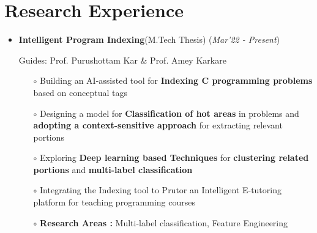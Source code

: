 \documentclass[10.8pt, a4paper]{extarticle}
\newcommand{\shorterSection}[1]{\vspace{-10pt}\section{#1}}
\begin{document}
\shorterSection{Research Experience}
\vspace{-2pt}
\begin{itemize}
\item \textbf{Intelligent Program Indexing}(M.Tech Thesis)
\hfill\hfill(\textit{Mar'22 - Present})

Guides: Prof. Purushottam Kar \& Prof. Amey Karkare
\begin{itemize}
          \item[$\circ$] Building an AI-assisted tool for \textbf{Indexing C programming problems} based on conceptual tags\\[-0.6cm]
          
          \item[$\circ$] Designing a model for \textbf{Classification of hot areas} in problems and \textbf{adopting a context-sensitive approach} for extracting relevant portions\\[-0.6cm]
          \item[$\circ$] Exploring \textbf {Deep learning based Techniques} for \textbf {clustering related portions} and \textbf{multi-label classification}\\[-0.6cm]
          \item[$\circ$] Integrating the Indexing tool to Prutor an Intelligent E-tutoring platform for teaching programming courses\\[-0.6cm]
          \item[$\circ$] \textbf{Research Areas :} Multi-label classification, Feature Engineering
          
    \end{itemize}
\end{itemize}
\medskip
\end{document}
